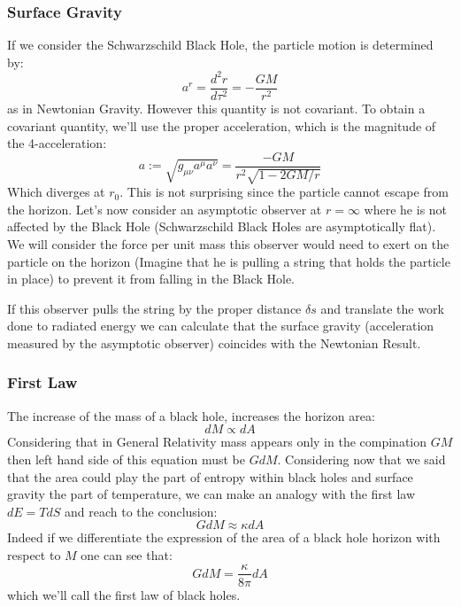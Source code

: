\documentclass[12pt]{article}
\begin{document}
\subsubsection{Surface Gravity}

If we consider the Schwarzschild Black Hole, the particle motion is determined by:
\[
    a^r = \frac{d^2r}{d\tau^2} = -\frac{GM}{r^2}
\]
as in Newtonian Gravity. However this quantity is not covariant. To obtain a covariant quantity, we'll use the proper acceleration, which is the magnitude of the 4-acceleration:
\[
    a := \sqrt{g_{\mu\nu}a^\mu a^\nu} = \frac{-GM}{r^2\sqrt{1-2GM/r}}
\]
Which diverges at $r_0$. This is not surprising since the particle cannot escape from the horizon. Let's now consider an asymptotic observer at $r=\infty$ where he is not affected by the Black Hole (Schwarzschild Black Holes are asymptotically flat). We will consider the force per unit mass this observer would need to exert on the particle on the horizon (Imagine that he is pulling a string that holds the particle in place) to prevent it from falling in the Black Hole.

\vspace{.25cm}

If this observer pulls the string by the proper distance $\delta s$  and translate the work done to radiated energy we can calculate that the surface gravity (acceleration measured by the asymptotic observer) coincides with the Newtonian Result.

\subsubsection{First Law}

The increase of the mass of a black hole, increases the horizon area:
\[
    dM \propto dA
\]
Considering that in General Relativity mass appears only in the compination $GM$ then left hand side of this equation must be $GdM$. Considering now that we said that the area could play the part of entropy within black holes and surface gravity the part of temperature, we can make an analogy with the first law $dE = TdS$ and reach to the conclusion:
\[
    GdM \approx \kappa dA
\]
Indeed if we differentiate the expression of the area of a black hole horizon with respect to $M$ one can see that:
\[
    GdM = \frac{\kappa}{8\pi}dA
\]
which we'll call the first law of black holes.
\end{document}
